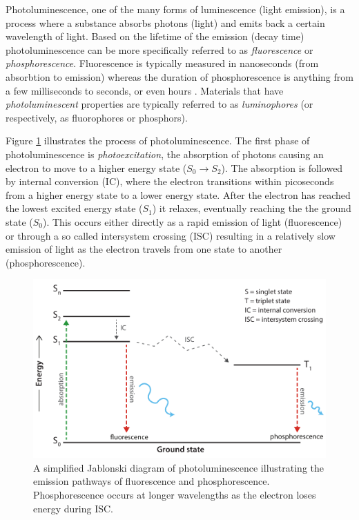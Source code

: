 \documentclass[thesis.tex]{subfiles}
\begin{document}
Photoluminescence, one of the many forms of luminescence (light emission), is a process where a substance absorbs photons (light) and emits back a certain wavelength of light. Based on the lifetime of the emission (decay time) photoluminescence can be more specifically referred to as \emph{fluorescence} or \emph{phosphorescence}. Fluorescence is typically measured in nanoseconds (from absorbtion to emission) whereas the duration of phosphorescence is anything from a few milliseconds to seconds, or even hours \cite{luminescence_basics}. Materials that have \emph{photoluminescent} properties are typically referred to as \emph{luminophores} (or respectively, as fluorophores or phosphors).

Figure \ref{figure:photoluminescence} illustrates the process of photoluminescence. The first phase of photoluminescence is \emph{photoexcitation}, the absorption of photons causing an electron to move to a higher energy state ($S_0 \rightarrow S_2$). The absorption is followed by internal conversion (IC), where the electron transitions within picoseconds from a higher energy state to a lower energy state. After the electron has reached the lowest excited energy state ($S_1$) it relaxes, eventually reaching the the ground state ($S_0$). This occurs either directly as a rapid emission of light (fluorescence) or through a so called intersystem crossing (ISC) resulting in a relatively slow emission of light as the electron travels from one state to another (phosphorescence).

\begin{figure}[hb]
\centering \includegraphics[width=\textwidth]{images/photoluminescence.pdf}
\caption{A simplified Jablonski diagram of photoluminescence illustrating the emission pathways of fluorescence and phosphorescence. Phosphorescence occurs at longer wavelengths as the electron loses energy during ISC. \label{figure:photoluminescence}}
\end{figure}
\end{document}
